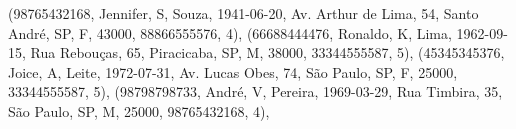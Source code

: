 \documentclass[
]{article}
\newenvironment{Shaded}{\begin{snugshade}}{\end{snugshade}}
\newcommand{\DecValTok}[1]{\textcolor[rgb]{0.00,0.00,0.81}{#1}}
\newcommand{\NormalTok}[1]{#1}
\newcommand{\StringTok}[1]{\textcolor[rgb]{0.31,0.60,0.02}{#1}}
\begin{document}
\begin{Shaded}
\begin{Highlighting}[]
\NormalTok{(}\StringTok{\textquotesingle{}98765432168\textquotesingle{}}\NormalTok{, }\StringTok{\textquotesingle{}Jennifer\textquotesingle{}}\NormalTok{, }\StringTok{\textquotesingle{}S\textquotesingle{}}\NormalTok{, }\StringTok{\textquotesingle{}Souza\textquotesingle{}}\NormalTok{, }\StringTok{\textquotesingle{}1941{-}06{-}20\textquotesingle{}}\NormalTok{, }\StringTok{\textquotesingle{}Av. Arthur de Lima, 54, Santo André, SP\textquotesingle{}}\NormalTok{,}
\StringTok{\textquotesingle{}F\textquotesingle{}}\NormalTok{, }\DecValTok{43000}\NormalTok{, }\StringTok{\textquotesingle{}88866555576\textquotesingle{}}\NormalTok{, }\DecValTok{4}\NormalTok{),}
\NormalTok{(}\StringTok{\textquotesingle{}66688444476\textquotesingle{}}\NormalTok{, }\StringTok{\textquotesingle{}Ronaldo\textquotesingle{}}\NormalTok{, }\StringTok{\textquotesingle{}K\textquotesingle{}}\NormalTok{, }\StringTok{\textquotesingle{}Lima\textquotesingle{}}\NormalTok{, }\StringTok{\textquotesingle{}1962{-}09{-}15\textquotesingle{}}\NormalTok{, }\StringTok{\textquotesingle{}Rua Rebouças, 65, Piracicaba, SP\textquotesingle{}}\NormalTok{, }
\StringTok{\textquotesingle{}M\textquotesingle{}}\NormalTok{, }\DecValTok{38000}\NormalTok{, }\StringTok{\textquotesingle{}33344555587\textquotesingle{}}\NormalTok{, }\DecValTok{5}\NormalTok{),}
\NormalTok{(}\StringTok{\textquotesingle{}45345345376\textquotesingle{}}\NormalTok{, }\StringTok{\textquotesingle{}Joice\textquotesingle{}}\NormalTok{, }\StringTok{\textquotesingle{}A\textquotesingle{}}\NormalTok{, }\StringTok{\textquotesingle{}Leite\textquotesingle{}}\NormalTok{, }\StringTok{\textquotesingle{}1972{-}07{-}31\textquotesingle{}}\NormalTok{, }\StringTok{\textquotesingle{}Av. Lucas Obes, 74, São Paulo, SP\textquotesingle{}}\NormalTok{, }
\StringTok{\textquotesingle{}F\textquotesingle{}}\NormalTok{, }\DecValTok{25000}\NormalTok{, }\StringTok{\textquotesingle{}33344555587\textquotesingle{}}\NormalTok{, }\DecValTok{5}\NormalTok{),}
\NormalTok{(}\StringTok{\textquotesingle{}98798798733\textquotesingle{}}\NormalTok{, }\StringTok{\textquotesingle{}André\textquotesingle{}}\NormalTok{, }\StringTok{\textquotesingle{}V\textquotesingle{}}\NormalTok{, }\StringTok{\textquotesingle{}Pereira\textquotesingle{}}\NormalTok{, }\StringTok{\textquotesingle{}1969{-}03{-}29\textquotesingle{}}\NormalTok{, }\StringTok{\textquotesingle{}Rua Timbira, 35, São Paulo, SP\textquotesingle{}}\NormalTok{, }
\StringTok{\textquotesingle{}M\textquotesingle{}}\NormalTok{, }\DecValTok{25000}\NormalTok{, }\StringTok{\textquotesingle{}98765432168\textquotesingle{}}\NormalTok{, }\DecValTok{4}\NormalTok{),}

\end{Highlighting}
\end{Shaded}
\end{document}
